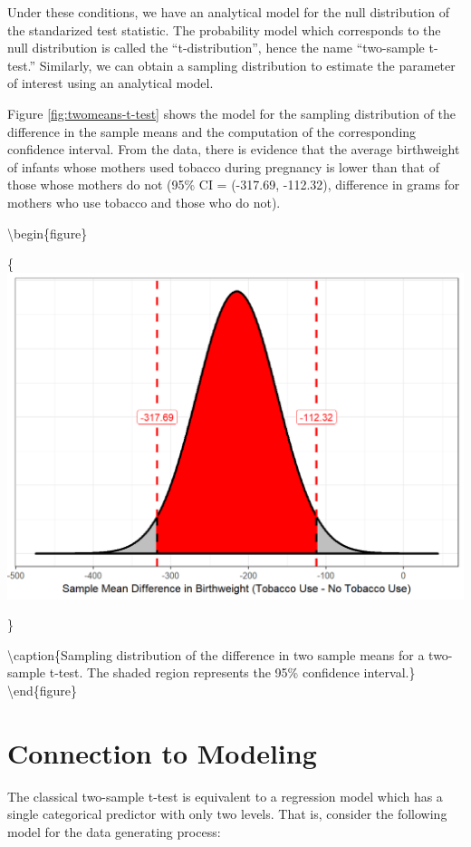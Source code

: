 \documentclass[]{book}
\theoremstyle{definition}
\theoremstyle{definition}
\theoremstyle{definition}
\theoremstyle{remark}
\begin{document}
Under these conditions, we have an analytical model for the null
distribution of the standarized test statistic. The probability model
which corresponds to the null distribution is called the
``t-distribution'', hence the name ``two-sample t-test.'' Similarly, we
can obtain a sampling distribution to estimate the parameter of interest
using an analytical model.

Figure \ref{fig:twomeans-t-test} shows the model for the sampling
distribution of the difference in the sample means and the computation
of the corresponding confidence interval. From the data, there is
evidence that the average birthweight of infants whose mothers used
tobacco during pregnancy is lower than that of those whose mothers do
not (95\% CI = (-317.69, -112.32), difference in grams for mothers who
use tobacco and those who do not).

\textbackslash{}begin\{figure\}

\{\centering \includegraphics[width=0.8\linewidth]{./Images/twomeans-t-test-1}

\}

\textbackslash{}caption\{Sampling distribution of the difference in two
sample means for a two-sample t-test. The shaded region represents the
95\% confidence interval.\}\label{fig:twomeans-t-test}
\textbackslash{}end\{figure\}

\section{Connection to Modeling}\label{connection-to-modeling-1}

The classical two-sample t-test is equivalent to a regression model
which has a single categorical predictor with only two levels. That is,
consider the following model for the data generating process:
\end{document}
